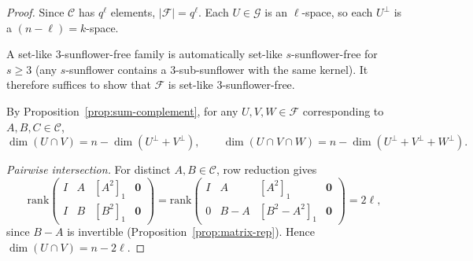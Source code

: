 \documentclass[10pt,a4paper]{amsart}
\begin{document}
\begin{proof}
Since $\mathcal{C}$ has $q^\ell$ elements, $|\mathcal{F}| = q^\ell$. Each $U \in \mathcal{G}$ is an $\ell$-space, so each $U^\perp$ is a $(n-\ell) = k$-space.

A set-like $3$-sunflower-free family is automatically set-like $s$-sunflower-free for $s \geq 3$ (any $s$-sunflower contains a $3$-sub-sunflower with the same kernel). It therefore suffices to show that $\mathcal{F}$ is set-like $3$-sunflower-free.

By Proposition~\ref{prop:sum-complement}, for any $U, V, W \in \mathcal{F}$ corresponding to $A, B, C \in \mathcal{C}$,
\[
\dim(U \cap V) = n - \dim(U^\perp + V^\perp), \qquad \dim(U \cap V \cap W) = n - \dim(U^\perp + V^\perp + W^\perp).
\]

\textit{Pairwise intersection.} For distinct $A, B \in \mathcal{C}$, row reduction gives
\[
\mathrm{rank}\begin{pmatrix} I & A & [A^2]_1 & \mathbf{0} \\ I & B & [B^2]_1 & \mathbf{0} \end{pmatrix}
= \mathrm{rank}\begin{pmatrix} I & A & [A^2]_1 & \mathbf{0} \\ 0 & B - A & [B^2 - A^2]_1 & \mathbf{0} \end{pmatrix}
= 2\ell,
\]
since $B - A$ is invertible (Proposition~\ref{prop:matrix-rep}). Hence $\dim(U \cap V) = n - 2\ell$.


\end{proof}
\end{document}
